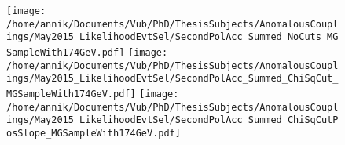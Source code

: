 \begin{figure}[h!t]
 \centering
 \texttt{[image: /home/annik/Documents/Vub/PhD/ThesisSubjects/AnomalousCouplings/May2015\_LikelihoodEvtSel/SecondPolAcc\_Summed\_NoCuts\_MGSampleWith174GeV.pdf]}
 \texttt{[image: /home/annik/Documents/Vub/PhD/ThesisSubjects/AnomalousCouplings/May2015\_LikelihoodEvtSel/SecondPolAcc\_Summed\_ChiSqCut\_MGSampleWith174GeV.pdf]}
 \texttt{[image: /home/annik/Documents/Vub/PhD/ThesisSubjects/AnomalousCouplings/May2015\_LikelihoodEvtSel/SecondPolAcc\_Summed\_ChiSqCutPosSlope\_MGSampleWith174GeV.pdf]}
\end{figure}
